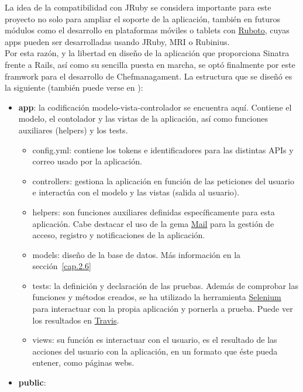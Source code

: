 La idea de la compatibilidad con JRuby se considera importante para este proyecto no solo para ampliar el soporte de la aplicación, también en futuros módulos como el desarrollo en plataformas móviles o tablets con \href{http://ruboto.org/}{Ruboto}, cuyas apps pueden ser desarrolladas usando JRuby, MRI o Rubinius. \\

Por esta razón, y la libertad en diseño de la aplicación que proporciona Sinatra frente a Rails, así como su sencilla puesta en marcha, se optó finalmente por este framwork para el desarrollo de Chefmanagament. La estructura que se diseñó es la siguiente (también puede verse en \cite{URL:GitHub}):

\begin{itemize}
	\item \textbf{app}: la codificación modelo-vista-controlador se encuentra aquí. Contiene el modelo, el contolador y las vistas de la aplicación, así como funciones auxiliares (helpers) y los tests.
		\begin{itemize}
			\item config.yml: contiene los tokens e identificadores para las distintas APIs y correo usado por la aplicación.
			\item controllers: gestiona la aplicación en función de las peticiones del usuario e interactúa con el modelo y las vistas (salida al usuario).
			\item helpers: son funciones auxiliares definidas específicamente para esta aplicación. Cabe destacar el uso de la gema \href{https://github.com/mikel/mail}{Mail} para la gestión de acceso, registro y notificaciones de la aplicación.
			\item models: diseño de la base de datos. Más información en la sección~\ref{cap.2.6}
			\item tests: la definición y declaración de las pruebas. Además de comprobar las funciones y métodos creados, se ha utilizado la herramienta \href{http://www.seleniumhq.org/}{Selenium} para interactuar con la propia aplicación y pornerla a prueba. Puede ver los resultados en \href{https://travis-ci.org/alu0100207385/ChefManagement?branch=testing}{Travis}.
			\item views: su función es interactuar con el usuario, es el resultado de las acciones del usuario con la aplicación, en un formato que éste pueda entener, como páginas webs.
		\end{itemize}
	\item \textbf{public}:
		\begin{itemize}

\end{itemize}
\end{itemize}
